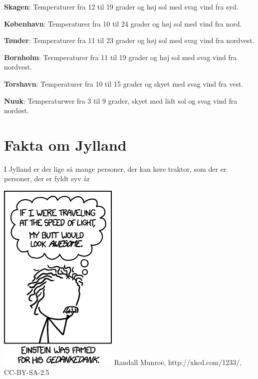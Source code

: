 \begin{minipage}[b]{0.95\linewidth}
\begin{minipage}[t]{0.47\textwidth}
\textbf{Skagen}: Temperaturer fra 12 til 19 grader og høj sol med svag vind fra syd.

\textbf{København}: Temperaturer fra 10 til 24 grader og høj sol med vind fra nord.

\textbf{Tønder}: Temperaturer fra 11 til 23 grader og høj sol med svag vind fra nordvest.

\textbf{Bornholm}: Termperaturer fra 11 til 19 grader og høj sol med svag vind fra nordvest.

\textbf{Torshavn}: Temperaturer fra 10 til 15 grader og skyet med svag vind fra vest.

\textbf{Nuuk}: Temperaturwer fra 3 til 9 grader, skyet med lidt sol og svag vind fra nordøst.

\section*{Fakta om Jylland}
I Jylland er der lige så mange personer, der kan køre traktor, som der er personer, der er fyldt syv år

\vspace{1mm}
\includegraphics[width=\linewidth]{relativity.png}
\tiny Randall Munroe, http://xkcd.com/1233/, CC-BY-SA-2.5


\end{minipage}
\end{minipage}
